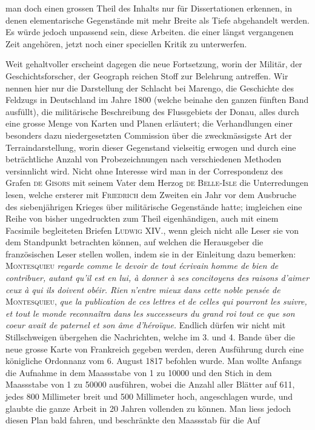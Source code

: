 %
man doch einen grossen Theil des Inhalts nur für Dissertationen erkennen, in denen elementarische Gegenstände mit mehr Breite als Tiefe abgehandelt werden. Es würde jedoch unpassend sein, diese Arbeiten. die einer längst vergangenen Zeit angehören, jetzt noch einer speciellen Kritik zu unterwerfen.

Weit gehaltvoller erscheint dagegen die neue Fortsetzung, worin der Militär, der Geschichtsforscher, der Geograph reichen Stoff zur Belehrung antreffen. Wir nennen hier nur die Darstellung der Schlacht bei Marengo, die Geschichte des Feldzugs in Deutschland im Jahre 1800 (welche beinahe den ganzen fünften Band ausfüllt), die militärische Beschreibung des Flussgebiets der Donau, alles durch eine grosse Menge von Karten und Planen erläutert; die Verhandlungen einer besonders dazu niedergesetzten Commission über die zweckmässigste Art der Terraindarstellung, worin dieser Gegenstand vielseitig erwogen und durch eine beträchtliche Anzahl von Probezeichnungen nach verschiedenen Methoden versinnlicht wird. Nicht ohne Interesse wird man in der Correspondenz des Grafen \textsc{de Gisors} mit seinem Vater dem Herzog \textsc{de Belle-Isle} die Unterredungen lesen, welche ersterer mit \textsc{Friedrich} dem Zweiten ein Jahr vor dem Ausbruche des siebenjährigen Krieges über militärische Gegenstände hatte; imgleichen eine Reihe von bisher ungedruckten zum Theil eigenhändigen, auch mit einem Facsimile begleiteten Briefen \textsc{Ludwig} XIV., wenn gleich nicht alle Leser sie von dem Standpunkt betrachten können, auf welchen die Herausgeber die französischen Leser stellen wollen, indem sie in der Einleitung dazu bemerken: \textsc{Montesquieu} \textit{regarde comme le devoir de tout écrivain homme de bien de contribuer, autant qu’il est en lui, à donner à ses concitoyens des raisons d’aimer ceux à qui ils doivent obéir. Rien n’entre mieux dans cette noble pensée de} \textsc{Montesquieu}, \textit{que la publication de ces lettres et de celles qui pourront les suivre, et tout le monde reconnaîtra dans les successeurs du grand roi tout ce que son coeur avait de paternel et son âme d’héroïque.} Endlich dürfen wir nicht mit Stillschweigen übergehen die Nachrichten, welche im 3. und 4. Bande über die neue grosse Karte von Frankreich gegeben werden, deren Ausführung durch eine königliche Ordonnanz vom 6. August 1817 befohlen wurde. Man wollte Anfangs die Aufnahme in dem Maassstabe von 1 zu 10000 und den Stich in dem Maassstabe von 1 zu 50000 ausführen, wobei die Anzahl aller Blätter auf 611, jedes 800 Millimeter breit und 500 Millimeter hoch, angeschlagen wurde, und glaubte die ganze Arbeit in 20 Jahren vollenden zu können. Man liess jedoch diesen Plan bald fahren, und beschränkte den Maassstab für die Auf%
